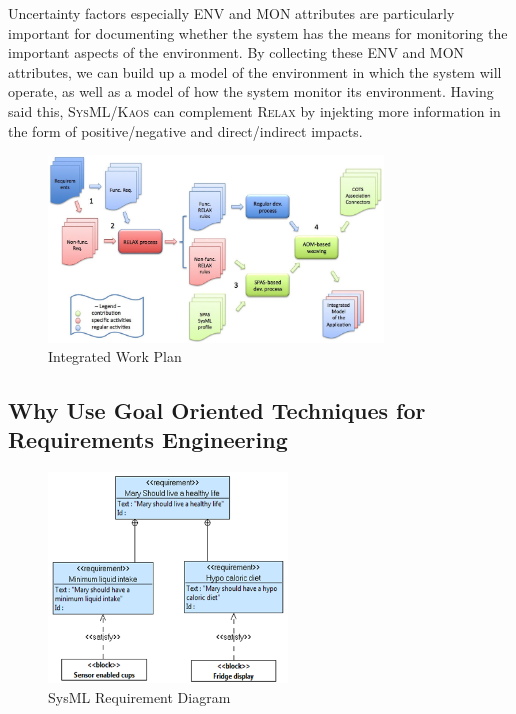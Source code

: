 \documentclass[10pt, conference, compsocconf]{IEEEtran}
\def\myrelax{\textsc{Relax}}                  %
\def\sysml{\textsc{SysML}}
\def\kaos{\textsc{Kaos}}
\begin{document}
Uncertainty factors especially ENV and MON attributes are particularly important for documenting whether the system has the means for monitoring the important aspects of the environment. By collecting these ENV and MON attributes, we can build up a model of the environment in which the system will operate, as well as a model of how the system monitor its environment. Having said this, \sysml{}/\kaos{} can complement \myrelax{} by injekting more information in the form of positive/negative and direct/indirect impacts. 

\begin{figure}[!t]
\centering
\includegraphics[width=3.5in]{fig1}
\caption{Integrated Work Plan}
\label{fig:Workplan}
\end{figure}

\subsection{Why Use Goal Oriented Techniques for Requirements Engineering}


\begin{figure}[!t]
\centering
\includegraphics[width=2.5in]{fig14}
\caption{SysML Requirement Diagram}
\label{fig:ReqDiag}
\end{figure}
\end{document}
